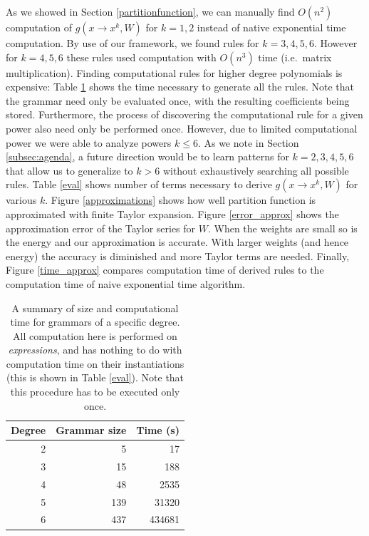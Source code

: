As we showed in Section \ref{partitionfunction}, we can manually find
$O(n^2)$ computation of $g(x \rightarrow x^k, W)$ for $k = 1, 2$
instead of native exponential time computation. By use of our
framework, we found rules for $k = 3, 4, 5, 6$. However for $k = 4, 5, 6$
these rules used computation with $O(n^3)$ time (i.e.~matrix
multiplication). Finding computational rules for higher degree
polynomials is expensive: Table \ref{grammars} shows the time
necessary to generate all the rules. Note that the grammar
need only be evaluated once, with the resulting coefficients being
stored. Furthermore, the process of discovering the computational rule
for a given power also need only be performed once. However, due to limited computational
power we were able to analyze powers $k \leq 6$. As we note in Section
\ref{subsec:agenda}, a future direction would be to learn patterns for
$k=2, 3, 4, 5, 6$ that allow us to generalize to $k>6$ without exhaustively
searching all possible rules. 
Table \ref{eval} shows number of terms necessary to derive $g(x
\rightarrow x^k, W)$ for various $k$. Figure \ref{approximations}
shows how well partition function is approximated with finite Taylor
expansion. Figure \ref{error_approx} shows the approximation error of
the Taylor series for $W$. When the weights are small so is the energy
and our approximation is accurate. With larger weights (and hence
energy) the accuracy is diminished and more Taylor terms are needed. Finally,
Figure \ref{time_approx} compares computation time of derived rules to
the computation time of naive exponential time algorithm.

\begin{table}
\tiny
\centering
\begin{tabular}{rrr}
\hline
Degree & Grammar size & Time (s) \\
\hline
2 & 5 & 17 \\
3 & 15 & 188 \\
4 & 48 & 2535\\
5 & 139 & 31320 \\
6 & 437 & 434681 \\
\hline
\end{tabular}
\caption{A summary of size and computational time for grammars of a specific degree. 
  All computation here is performed on {\em expressions}, and has
  nothing to do with computation time on their instantiations (this is
  shown in Table \ref{eval}). Note that this procedure has to be executed only once.}
\label{grammars}
\vspace{-4mm}
\end{table}

